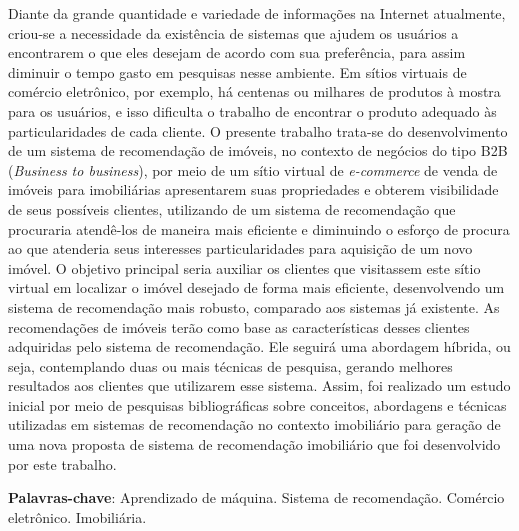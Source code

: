 \begin{resumo}

Diante da grande quantidade e variedade de informações na Internet atualmente, criou-se a necessidade da existência de sistemas que ajudem os usuários a encontrarem o que eles desejam de acordo com sua preferência, para assim diminuir o tempo gasto em pesquisas nesse ambiente. Em sítios virtuais de comércio eletrônico, por exemplo, há centenas ou milhares de produtos à mostra para os usuários, e isso dificulta o trabalho de encontrar o produto adequado às particularidades de cada cliente. O presente trabalho trata-se do desenvolvimento de um sistema de recomendação de imóveis, no contexto de negócios do tipo B2B (\textit{Business to business}), por meio de um sítio virtual de \textit{e-commerce} de venda de imóveis para imobiliárias apresentarem suas propriedades e obterem visibilidade de seus possíveis clientes, utilizando de um sistema de recomendação que procuraria atendê-los de maneira mais eficiente e diminuindo o esforço de procura ao que atenderia seus interesses particularidades para aquisição de um novo imóvel. O objetivo principal seria auxiliar os clientes que visitassem este sítio virtual em localizar o imóvel desejado de forma mais eficiente, desenvolvendo um sistema de recomendação mais robusto, comparado aos sistemas já existente. As recomendações de imóveis terão como base as características desses clientes adquiridas pelo sistema de recomendação. Ele seguirá uma abordagem híbrida, ou seja, contemplando duas ou mais técnicas de pesquisa, gerando melhores resultados aos clientes que utilizarem esse sistema. Assim, foi realizado um estudo inicial por meio de pesquisas bibliográficas sobre conceitos, abordagens e técnicas utilizadas em sistemas de recomendação no contexto imobiliário para geração de uma nova proposta de sistema de recomendação imobiliário que foi desenvolvido por este trabalho.

 \vspace{\onelineskip}
    
 \noindent
 \textbf{Palavras-chave}: Aprendizado de máquina. Sistema de recomendação. Comércio eletrônico. Imobiliária.
\end{resumo}
